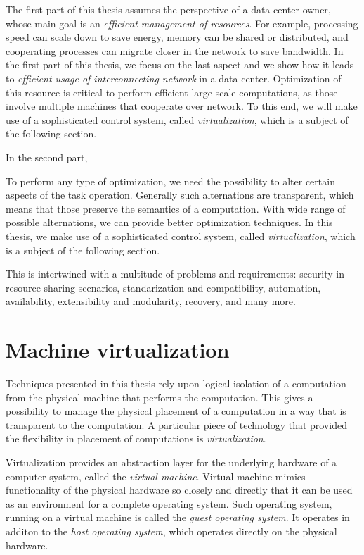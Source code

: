The first part of this thesis assumes the perspective of a data center owner, whose main goal is an \emph{efficient management of resources}.
For example, processing speed can scale down to save energy, memory can be shared or distributed, and cooperating processes can migrate closer in the network to save bandwidth.
In the first part of this thesis, we focus on the last aspect and we show how it leads to
\emph{efficient usage of interconnecting network} in a data center.
Optimization of this resource is critical to perform efficient large-scale computations, as those involve multiple machines that cooperate over network.
To this end, we will make use of a sophisticated control system, called \emph{virtualization}, which is a subject of the following section.

In the second part, 

To perform any type of optimization, we need the possibility to alter certain aspects of the task operation.
Generally such alternations are transparent, which means that those preserve the semantics of a computation.
With wide range of possible alternations, we can provide better optimization techniques.
In this thesis, we make use of a sophisticated control system, called \emph{virtualization}, which is a subject of the following section.

This is intertwined with a multitude of problems and requirements: security in resource-sharing scenarios, standarization and compatibility, automation, availability, extensibility and modularity, recovery, and many more.


\section{Machine virtualization}

Techniques presented in this thesis rely upon logical isolation of a computation from the physical machine that performs the computation.
This gives a possibility to manage the physical placement of a computation in a way that is transparent to the computation.
A particular piece of technology that provided the flexibility in placement of computations is \emph{virtualization}.

Virtualization provides an abstraction layer for the underlying hardware of a computer system, called the \emph{virtual machine}.
Virtual machine mimics functionality of the physical hardware so closely and
directly that it can be used as an environment for a complete operating system.
Such operating system, running on a virtual machine is called the \emph{guest
operating system}. It operates in additon to the \emph{host operating
system}, which operates directly on the physical hardware. 

